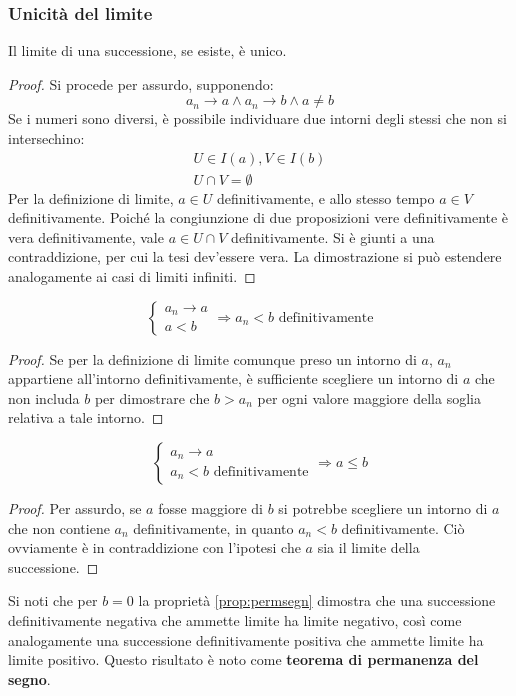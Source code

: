 \subsubsection{Unicità del limite}
\begin{prop}
	Il limite di una successione, se esiste, è unico.
\end{prop}
\begin{proof}
	Si procede per assurdo, supponendo:
	\[
		a_n\to a\land a_n\to b \land a\neq b
	\]
	Se i numeri sono diversi, è possibile individuare due intorni degli stessi che non si intersechino:
	\begin{gather*}
		U\in I(a),V\in I(b)\\
		U\cap V=\emptyset
	\end{gather*}
	Per la definizione di limite, $a\in U$ definitivamente, e allo stesso tempo $a\in V$ definitivamente. Poiché la congiunzione di due proposizioni vere definitivamente è vera definitivamente, vale $a\in U\cap V$ definitivamente. Si è giunti a una contraddizione, per cui la tesi dev'essere vera. La dimostrazione si può estendere analogamente ai casi di limiti infiniti.
\end{proof}

\begin{prop}
	\[
		\begin{cases}
			a_n\to a \\
			a<b
		\end{cases}\Rightarrow a_n<b \text{ definitivamente}
	\]
\end{prop}
\begin{proof}
	Se per la definizione di limite comunque preso un intorno di $a$, $a_n$ appartiene all'intorno definitivamente, è sufficiente scegliere un intorno di $a$ che non includa $b$ per dimostrare che $b>a_n$ per ogni valore maggiore della soglia relativa a tale intorno.
\end{proof}

\begin{prop} \label{prop:permsegn}
	\[
		\begin{cases}
			a_n\to a \\
			a_n<b \text{ definitivamente}
		\end{cases}\Rightarrow a\leq b
	\]
\end{prop}
\begin{proof}
	Per assurdo, se $a$ fosse maggiore di $b$ si potrebbe scegliere un intorno di $a$ che non contiene $a_n$ definitivamente, in quanto $a_n<b$ definitivamente. Ciò ovviamente è in contraddizione con l'ipotesi che $a$ sia il limite della successione.
\end{proof}
Si noti che per $b=0$ la proprietà \ref{prop:permsegn} dimostra che una successione definitivamente negativa che ammette limite ha limite negativo, così come analogamente una successione definitivamente positiva che ammette limite ha limite positivo. Questo risultato è noto come \textbf{teorema di permanenza del segno}.

